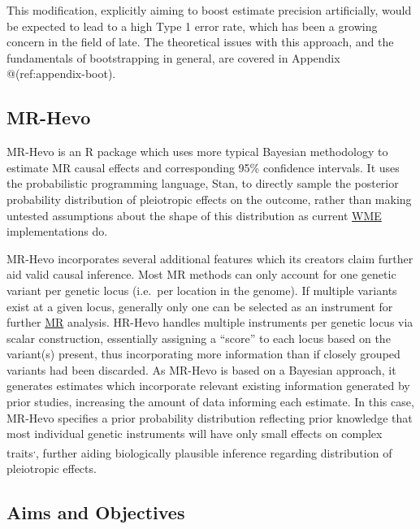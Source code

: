 \documentclass[
]{article}
\begin{document}
This modification, explicitly aiming to boost estimate precision artificially, would be expected to lead to a high Type 1 error rate, which has been a growing concern in the field of late\textsuperscript{}. The theoretical issues with this approach, and the fundamentals of bootstrapping in general, are covered in Appendix @(ref:appendix-boot).

\subsection{MR-Hevo}\label{mr-hevo}

MR-Hevo is an R package which uses more typical Bayesian methodology to estimate MR causal effects and corresponding 95\% confidence intervals. It uses the probabilistic programming language, Stan, to directly sample the posterior probability distribution of pleiotropic effects on the outcome, rather than making untested assumptions about the shape of this distribution as current \hyperref[acronyms_WME]{WME} implementations do\textsuperscript{}.

MR-Hevo incorporates several additional features which its creators claim further aid valid causal inference. Most MR methods can only account for one genetic variant per genetic locus (i.e.~per location in the genome). If multiple variants exist at a given locus, generally only one can be selected as an instrument for further \hyperref[acronyms_MR]{MR} analysis. HR-Hevo handles multiple instruments per genetic locus via scalar construction, essentially assigning a ``score'' to each locus based on the variant(s) present, thus incorporating more information than if closely grouped variants had been discarded\textsuperscript{}. As MR-Hevo is based on a Bayesian approach, it generates estimates which incorporate relevant existing information generated by prior studies, increasing the amount of data informing each estimate. In this case, MR-Hevo specifies a prior probability distribution reflecting prior knowledge that most individual genetic instruments will have only small effects on complex traits\textsuperscript{,}, further aiding biologically plausible inference regarding distribution of pleiotropic effects.

\subsection{Aims and Objectives}\label{aims-and-objectives}
\end{document}
